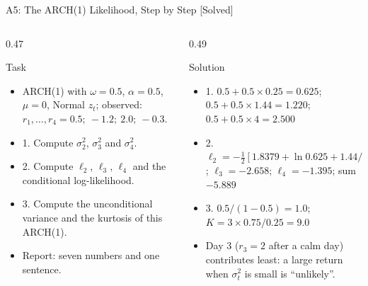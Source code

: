 \begin{frame}{A5: The ARCH(1) Likelihood, Step by Step [Solved]}
\itemsize{\scriptsize}
\begin{columns}[T]
\begin{column}{0.47\textwidth}
\begin{block}{Task}
\begin{itemize}
    \item ARCH(1) with $\omega = 0.5$, $\alpha = 0.5$, $\mu = 0$, Normal $z_t$; observed: $r_1, \dots, r_4 = 0.5;\ -1.2;\ 2.0;\ -0.3$.
    \item 1. Compute $\sigma_2^2$, $\sigma_3^2$ and $\sigma_4^2$.
    \item 2. Compute $\ell_2$, $\ell_3$, $\ell_4$ and the conditional log-likelihood.
    \item 3. Compute the unconditional variance and the kurtosis of this ARCH(1).
    \item Report: seven numbers and one sentence.
\end{itemize}
\end{block}
\end{column}
\begin{column}{0.49\textwidth}
\begin{exampleblock}{Solution}
\begin{itemize}
    \item 1. $0.5 + 0.5 \times 0.25 = 0.625$; $0.5 + 0.5 \times 1.44 = 1.220$; $0.5 + 0.5 \times 4 = 2.500$
    \item 2. $\ell_2 = -\frac12[1.8379 + \ln 0.625 + 1.44/0.625] = -1.836$; $\ell_3 = -2.658$; $\ell_4 = -1.395$; sum $-5.889$
    \item 3. $0.5/(1 - 0.5) = 1.0$; $K = 3 \times 0.75/0.25 = 9.0$
    \item Day 3 ($r_3 = 2$ after a calm day) contributes least: a large return when $\sigma_t^2$ is small is ``unlikely''.
\end{itemize}
\end{exampleblock}
\end{column}
\end{columns}
\end{frame}

